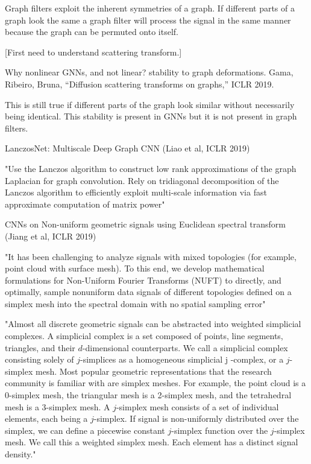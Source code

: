 \documentclass[english]{article}
\begin{document}
Graph filters exploit the inherent symmetries of a graph. If different parts
of a graph look the same a graph filter will process the signal in the same manner because the graph can be
permuted onto itself. 

[First need to understand scattering transform.]

\item 

Why nonlinear GNNs, and not linear?  stability to graph deformations. 
Gama, Ribeiro, Bruna, “Diffusion scattering transforms on graphs,” ICLR 2019.

This is still true if different parts of the graph look
similar without necessarily being identical. This stability is present in GNNs but it is not present in graph
filters. 

\item LanczosNet: Multiscale Deep Graph CNN (Liao et al, ICLR 2019)

"Use the Lanczos algorithm to construct low rank approximations of the graph Laplacian for graph convolution. Rely on tridiagonal decomposition of the Lanczos algorithm to efficiently exploit multi-scale information via fast approximate computation of matrix power" 

\item CNNs on Non-uniform geometric signals using Euclidean spectral transform (Jiang et al, ICLR 2019)

"It has been challenging to analyze signals with
mixed topologies (for example, point cloud with surface mesh). To this end, we
develop mathematical formulations for Non-Uniform Fourier Transforms (NUFT)
to directly, and optimally, sample nonuniform data signals of different topologies
defined on a simplex mesh into the spectral domain with no spatial sampling
error"

"Almost all discrete geometric signals can be abstracted into weighted simplicial complexes. A
simplicial complex is a set composed of points, line segments, triangles, and their $d$-dimensional
counterparts. We call a simplicial complex consisting solely of $j$-simplices as a homogeneous
simplicial j -complex, or a $j$-simplex mesh. Most popular geometric representations that the research
community is familiar with are simplex meshes. For example, the point cloud is a 0-simplex mesh, the
triangular mesh is a 2-simplex mesh, and the tetrahedral mesh is a 3-simplex mesh. A $j$-simplex mesh
consists of a set of individual elements, each being a $j$-simplex. If signal is non-uniformly distributed
over the simplex, we can define a piecewise constant $j$-simplex function over the $j$-simplex mesh.
We call this a weighted simplex mesh. Each element has a distinct signal density."
\end{document}
